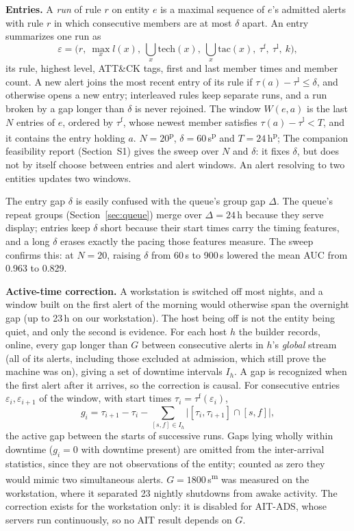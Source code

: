 \documentclass[conference]{IEEEtran}
\newcommand{\prov}{\textsuperscript{\textcolor{orange!80!black}{p}}}   %
\newcommand{\meas}{\textsuperscript{\textcolor{green!45!black}{m}}}    %
\begin{document}
\textbf{Entries.} A \emph{run} of rule $r$ on entity $e$ is a maximal sequence of $e$'s admitted alerts with rule $r$ in which consecutive members are at most $\delta$ apart. An entry summarizes one run as
\begin{equation}
\varepsilon = \big(r,\ \max_{x} l(x),\ \textstyle\bigcup_x \mathrm{tech}(x),\ \bigcup_x \mathrm{tac}(x),\ \tau^{\mathrm{f}},\ \tau^{\mathrm{l}},\ k\big),
\end{equation}
its rule, highest level, ATT\&CK tags, first and last member times and member count. A new alert joins the most recent entry of its rule if $\tau(a) - \tau^{\mathrm{l}} \le \delta$, and otherwise opens a new entry; interleaved rules keep separate runs, and a run broken by a gap longer than $\delta$ is never rejoined. The window $W(e,a)$ is the last $N$ entries of $e$, ordered by $\tau^{\mathrm{f}}$, whose newest member satisfies $\tau(a) - \tau^{\mathrm{l}} < T$, and it contains the entry holding $a$. $N = 20$\prov{}, $\delta = 60$\,s\prov{} and $T = 24$\,h\prov{}; The companion feasibility report (Section~S1) gives the sweep over $N$ and $\delta$: it fixes $\delta$, but does not by itself choose between entries and alert windows. An alert resolving to two entities updates two windows.

The entry gap $\delta$ is easily confused with the queue's group gap $\Delta$. The queue's repeat groups (Section~\ref{sec:queue}) merge over $\Delta = 24$\,h because they serve display; entries keep $\delta$ short because their start times carry the timing features, and a long $\delta$ erases exactly the pacing those features measure. The sweep confirms this: at $N = 20$, raising $\delta$ from 60\,s to 900\,s lowered the mean AUC from 0.963 to 0.829.

\textbf{Active-time correction.} A workstation is switched off most nights, and a window built on the first alert of the morning would otherwise span the overnight gap (up to 23\,h on our workstation). The host being off is not the entity being quiet, and only the second is evidence. For each host $h$ the builder records, online, every gap longer than $G$ between consecutive alerts in $h$'s \emph{global} stream (all of its alerts, including those excluded at admission, which still prove the machine was on), giving a set of downtime intervals $I_h$. A gap is recognized when the first alert after it arrives, so the correction is causal. For consecutive entries $\varepsilon_i, \varepsilon_{i+1}$ of the window, with start times $\tau_i = \tau^{\mathrm{f}}(\varepsilon_i)$,
\begin{equation}
g_i = \tau_{i+1} - \tau_i - \sum_{[s,f] \in I_h} \big| [\tau_i, \tau_{i+1}] \cap [s,f] \big| ,
\end{equation}
the active gap between the starts of successive runs. Gaps lying wholly within downtime ($g_i = 0$ with downtime present) are omitted from the inter-arrival statistics, since they are not observations of the entity; counted as zero they would mimic two simultaneous alerts. $G = 1800$\,s\meas{} was measured on the workstation, where it separated 23 nightly shutdowns from awake activity. The correction exists for the workstation only: it is disabled for AIT-ADS, whose servers run continuously, so no AIT result depends on $G$.
\end{document}
